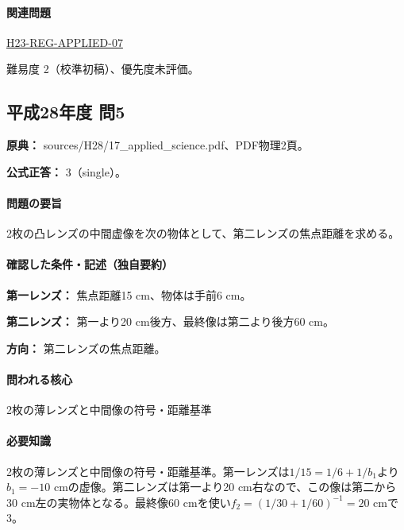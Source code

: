 \paragraph{関連問題} \hyperref[q:h23-reg-applied-07]{H23-REG-APPLIED-07}

\par 難易度 2（校準初稿）、優先度未評価。

\subsection{平成28年度 問5}
\label{q:h28-reg-applied-05}

\noindent\textbf{原典：} sources/H28/17\_applied\_science.pdf、PDF物理2頁。

\textbf{公式正答：} 3（single）。

\paragraph{問題の要旨} 2枚の凸レンズの中間虚像を次の物体として、第二レンズの焦点距離を求める。

\paragraph{確認した条件・記述（独自要約）}\mbox{}\par

\noindent\textbf{第一レンズ：} 焦点距離15 cm、物体は手前6 cm。\par

\noindent\textbf{第二レンズ：} 第一より20 cm後方、最終像は第二より後方60 cm。\par

\noindent\textbf{方向：} 第二レンズの焦点距離。\par

\paragraph{問われる核心} 2枚の薄レンズと中間像の符号・距離基準

\paragraph{必要知識} 2枚の薄レンズと中間像の符号・距離基準。第一レンズは\(1/15=1/6+1/b_1\)より\(b_1=-10\) cmの虚像。第二レンズは第一より20 cm右なので、この像は第二から30 cm左の実物体となる。最終像60 cmを使い\(f_2=(1/30+1/60)^{-1}=20\) cmで3。

